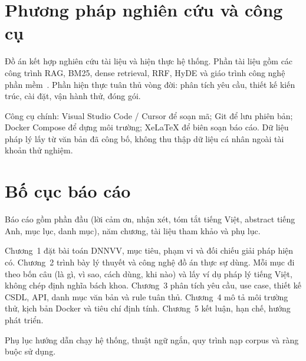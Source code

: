 \section{Phương pháp nghiên cứu và công cụ}

Đồ án kết hợp nghiên cứu tài liệu và hiện thực hệ thống. Phần tài liệu gồm các
công trình RAG, BM25, dense retrieval, RRF, HyDE và giáo trình công nghệ phần
mềm~\cite{thanh2024}. Phần hiện thực tuân thủ vòng đời: phân tích yêu cầu, thiết
kế kiến trúc, cài đặt, vận hành thử, đóng gói.

Công cụ chính: Visual Studio Code / Cursor để soạn mã; Git để lưu phiên bản;
Docker Compose để dựng môi trường; XeLaTeX để biên soạn báo cáo. Dữ liệu pháp lý
lấy từ văn bản đã công bố, không thu thập dữ liệu cá nhân ngoài tài khoản thử
nghiệm.

\section{Bố cục báo cáo}

Báo cáo gồm phần đầu (lời cảm ơn, nhận xét, tóm tắt tiếng Việt, abstract tiếng
Anh, mục lục, danh mục), năm chương, tài liệu tham khảo và phụ lục.

Chương~1 đặt bài toán DNNVV, mục tiêu, phạm vi và đối chiếu giải pháp hiện có.
Chương~2 trình bày lý thuyết và công nghệ đồ án thực sự dùng. Mỗi mục đi theo
bốn câu (là gì, vì sao, cách dùng, khi nào) và lấy ví dụ pháp lý tiếng Việt,
không chép định nghĩa bách khoa. Chương~3 phân tích yêu cầu,
use case, thiết kế CSDL, API, danh mục \soLuat{} văn bản và \soRule{} rule tuân
thủ. Chương~4 mô tả môi trường thử, kịch bản Docker và tiêu chí định tính.
Chương~5 kết luận, hạn chế, hướng phát triển.

Phụ lục hướng dẫn chạy hệ thống, thuật ngữ ngắn, quy trình nạp corpus và ràng
buộc sử dụng.
